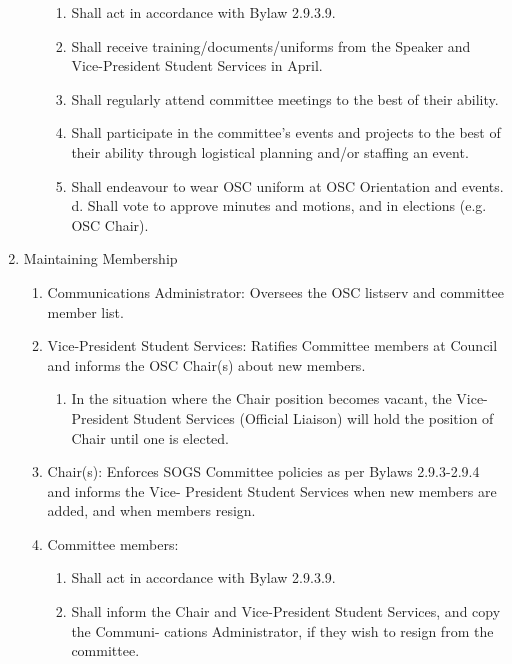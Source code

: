 \begin{enumerate}[label*=\arabic*., align=left]
\begin{enumerate}[label*=\arabic*., align=left]
\begin{enumerate}
\item Shall act in accordance with Bylaw 2.9.3.9.
\item Shall receive training/documents/uniforms from the Speaker and Vice-President Student Services in April.
\item Shall regularly attend committee meetings to the best of their ability.
\item Shall participate in the committee's events and projects to the best of their ability through
logistical planning and/or staffing an event.
\item Shall endeavour to wear OSC uniform at OSC Orientation and events. d. Shall vote to approve minutes and motions, and in elections (e.g. OSC Chair).
\end{enumerate}

\end{enumerate}
\item Maintaining Membership
\begin{enumerate}[label*=\arabic*., align=left]	
\item Communications Administrator: Oversees the OSC listserv and committee member list.
\item Vice-President Student Services: Ratifies Committee members at Council and informs the
OSC Chair(s) about new members.
\begin{enumerate}
\item In the situation where the Chair position becomes vacant, the Vice-President Student
Services (Official Liaison) will hold the position of Chair until one is elected.
\end{enumerate}
\item Chair(s): Enforces SOGS Committee policies as per Bylaws 2.9.3-2.9.4 and informs the Vice-
President Student Services when new members are added, and when members resign.
\item Committee members:
\begin{enumerate}
\item Shall act in accordance with Bylaw 2.9.3.9.
\item Shall inform the Chair and Vice-President Student Services, and copy the
Communi- cations Administrator, if they wish to resign from the committee.
\end{enumerate}
\end{enumerate}
\end{enumerate}

